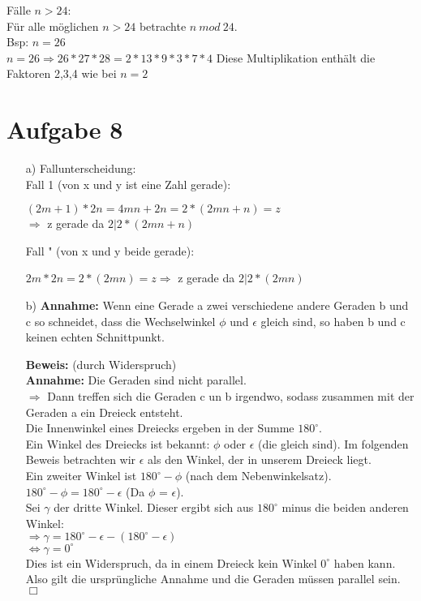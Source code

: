 \documentclass[paper = a4, ngerman]{scrartcl}
\begin{document}
\begin{itemize}
			Fälle $n>24$:\\
				Für alle möglichen $n>24$ betrachte $n\ mod\ 24$.\\
				Bsp: $n=26$\\
				$n=26 \Rightarrow 26*27*28 = 2*13*9*3*7*4$
				Diese Multiplikation enthält die Faktoren 2,3,4 wie bei $n=2$
		\end{itemize}
	\newpage
	
	\section*{Aufgabe 8}
		\begin{itemize}
			\item[a)] Fallunterscheidung:\\
			Fall 1 (von x und y ist eine Zahl gerade):
			\begin{center}
				$(2m + 1) * 2n = 4mn + 2n = 2*(2mn + n) = z $\\$\Rightarrow$ z gerade da $2|2*(2mn + n)$
			\end{center}
			Fall " (von x und y beide gerade):
			\begin{center}
				$2m * 2n = 2*(2mn) = z \Rightarrow$ z gerade da $2|2*(2mn)$
			\end{center}
		
			\item[b)]
			\textbf{Annahme:} Wenn eine Gerade a zwei verschiedene andere Geraden b und c so schneidet, dass die Wechselwinkel
			$\phi$ und $\epsilon$ gleich sind, so haben b und c keinen echten Schnittpunkt.
			
			\textbf{Beweis:} (durch Widerspruch)\\
			\textbf{Annahme:} Die Geraden sind nicht parallel.\\
			
			$\Rightarrow$ Dann treffen sich die Geraden c un b irgendwo, sodass zusammen mit der Geraden a ein Dreieck entsteht.\\
			
			Die Innenwinkel eines Dreiecks ergeben in der Summe $180^\circ$.\\
			
			Ein Winkel des Dreiecks ist bekannt: $\phi$ oder $\epsilon$ (die gleich sind). Im folgenden Beweis betrachten wir $\epsilon$ als den Winkel, der in unserem Dreieck liegt.\\
			Ein zweiter Winkel ist $180^\circ - \phi$ (nach dem Nebenwinkelsatz).\\ $180^\circ - \phi = 180^\circ - \epsilon$ (Da $\phi$ = $\epsilon$).\\
			
			Sei $\gamma$ der dritte Winkel. Dieser ergibt sich aus $180^\circ$ minus die beiden anderen Winkel:\\
			$\Rightarrow \gamma = 180^\circ - \epsilon - (180^\circ - \epsilon) $ \\
			$\Leftrightarrow \gamma = 0^\circ$\\
			
			Dies ist ein Widerspruch, da in einem Dreieck kein Winkel $0^\circ$ haben kann. Also gilt die ursprüngliche Annahme und die Geraden müssen parallel sein.
			\hfil$\Box$
		\end{itemize}
	\pagebreak
\end{document}
